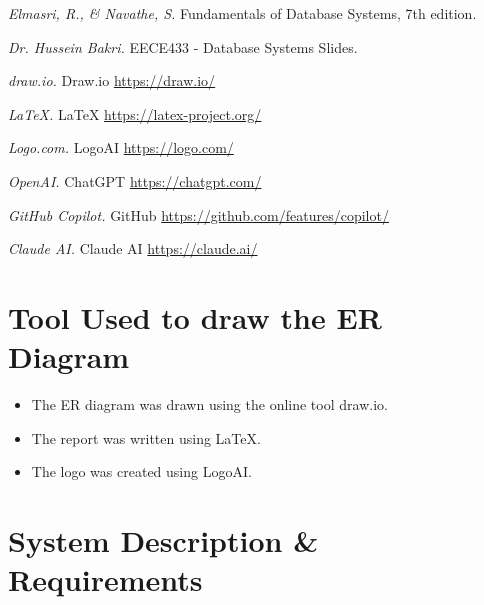 \documentclass[11pt]{article}
\begin{document}
\begin{thebibliography}{9}
  \textit{Elmasri, R., \& Navathe, S.} Fundamentals of Database Systems, 7th edition.
  
  \textit{Dr. Hussein Bakri.} EECE433 - Database Systems Slides.
  
  \textit{draw.io.} Draw.io
  \url{https://draw.io/}
  
  \textit{LaTeX.} LaTeX
  \url{https://latex-project.org/}
  
  \textit{Logo.com.} LogoAI
  \url{https://logo.com/}
  
  \textit{OpenAI.} ChatGPT
  \url{https://chatgpt.com/}
  
  \textit{GitHub Copilot.} GitHub
  \url{https://github.com/features/copilot/}
  
  \textit{Claude AI.} Claude AI
  \url{https://claude.ai/}
\end{thebibliography}

\section{Tool Used to draw the ER Diagram}

\begin{itemize}
  \item The ER diagram was drawn using the online tool draw.io. \cite{drawio}
  \item The report was written using LaTeX. \cite{latex}
  \item The logo was created using LogoAI. \cite{logo}
\end{itemize}

\section{System Description \& Requirements}
\end{document}

